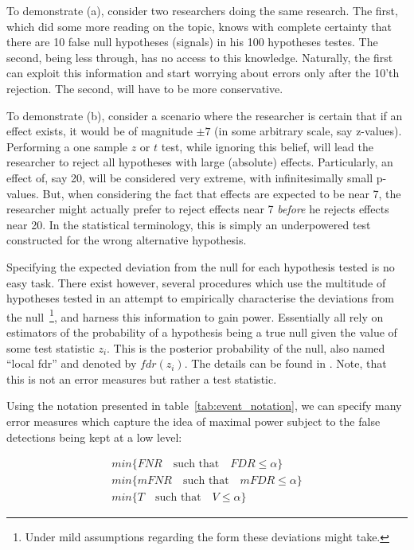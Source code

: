 \documentclass[review,12pt]{article}
\begin{document}
To demonstrate (a), consider two researchers doing the same research. The first, which did some more reading on the topic, knows with complete certainty that there are 10 false null hypotheses (signals) in his 100 hypotheses testes. The second, being less through, has no access to this knowledge. Naturally, the first can exploit this information and start worrying about errors only after the 10'th rejection. The second, will have to be more conservative.

To demonstrate (b), consider a scenario where the researcher is certain that if an effect exists, it would be of magnitude $\pm 7$ (in some arbitrary scale, say z-values). Performing a one sample $z$ or $t$ test, while ignoring this belief, will lead the researcher to reject all hypotheses with large (absolute) effects. Particularly, an effect of, say 20,  will be considered very extreme, with infinitesimally small p-values. But, when considering the fact that effects are expected to be near 7, the researcher might actually prefer to reject effects near 7 \emph{before} he rejects effects near 20. In the statistical terminology, this is simply an underpowered test constructed for the wrong alternative hypothesis. 

Specifying the expected deviation from the null for each hypothesis tested is no easy task. There exist however, several procedures which use the multitude of hypotheses tested in an attempt to empirically characterise the deviations from the null~\footnote{Under mild assumptions regarding the form these deviations might take.}, and harness this information to gain power. Essentially all rely on estimators of the probability of a hypothesis being a true null given the value of some test statistic $z_i$. This is the posterior probability of the null, also named ``local fdr'' and denoted by $fdr(z_i)$. The details can be found in \cite{efron_microarrays_2008}. Note, that this is not an error measures but rather a test statistic.  

Using the notation presented in table~\ref{tab:event_notation}, we can specify many error measures which capture the idea of maximal power subject to the false detections being kept at a low level:

\begin{align}
        min\{FNR \quad \text{such that} \quad FDR\leq \alpha \} \label{eq:compound_1}\\
	min\{mFNR \quad \text{such that} \quad mFDR\leq \alpha \} \label{eq:compound_2}\\
	min\{T \quad \text{such that} \quad V \leq \alpha \} \label{eq:compound_3}
\end{align}
\end{document}
